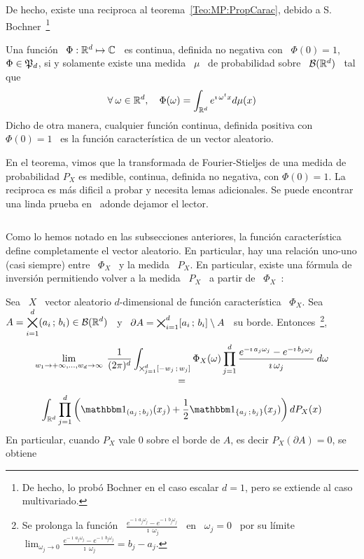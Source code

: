{De  hecho,  existe una  reciproca  al  teorema~\ref{Teo:MP:PropCarac}, debido  a
S. Bochner~\footnote{De  hecho, lo prob\'o Bochner  en el caso escalar  $d = 1$,
  pero  se extiende  al  caso multivariado.}~\cite{Boc32,  Boc59, Gol61,  Pin09,
  Sas13}
%
\begin{teorema}[Bochner]\label{Teo:MP:Bochner}
%
  Una  funci\'on \  $\Phi: \mathbb{R}^d  \mapsto \mathbb{C}$  \ es  continua,  definida no
  negativa con \ $\Phi(0) = 1$, \ie  $\Phi \in \mathfrak{P}_d$, si y solamente existe una
  medida \ $\mu$ \ de probabilidad sobre \ $\mathcal{B}(\mathbb{R}^d)$ \ tal que
  \[
  \forall \:  \omega \in \mathbb{R}^d, \quad \Phi(\omega)  = \int_{\mathbb{R}^d} e^{\imath
    \, \omega^t x} d\mu(x)
  \]
  Dicho de  otra manera, cualquier  funci\'on continua, definida positiva  con \
  $\Phi(0) = 1$ \ es la funci\'on caracter\'istica de un vector aleatorio.
\end{teorema}
%
En el  teorema, vimos que la  transformada de Fourier-Stieljes de  una medida de
probabilidad $P_X$  es medible, continua,  definida no negativa, con  $\Phi(0) =
1$. La  reciproca es  m\'as dificil  a probar y  necesita lemas  adicionales. Se
puede  encontrar una  linda prueba  en~\cite[Sec.~1.7]{Sas13} adonde  dejamor el
lector.

%
\[
\]

Como   lo  hemos   notado   en  las   subsecciones   anteriores,  la   funci\'on
caracter\'istica define  completamente el  vector aleatorio. En  particular, hay
una relaci\'on uno-uno (casi siempre) entre \ $\Phi_X$ \ y la medida \ $P_X$. En
particular, existe una f\'ormula de inversi\'on permitiendo volver a la medida \
$P_X$ \ a partir de \ $\Phi_X$~\cite{AshDol99, Sas13}:
%
\begin{teorema}\label{Teo:MP:InversionFourierStieljes}
%
  Sea \ $X$  \ vector aleatorio $d$-dimensional de  funci\'on caracter\'istica \
  $\Phi_X$.   Sea  \  $\displaystyle  A  = \operatorname*{\bigtimes}_{i=1}^d  (a_i  \, ; \,  b_i)  \in
  \mathcal{B}(\mathbb{R}^d)$ \ y \ $\partial A  = \operatorname*{\bigtimes}_{i=1}^d [a_i \, ; \, b_i] \setminus A$ \
  su borde. Entonces~\footnote{Se prolonga  la funci\'on \ $\frac{e^{- \imath \,
        a_j \omega_j} - e^{- \imath  \, b_j \omega_j}}{\imath \, \omega_j}$ \ en
    \ $\omega_j  = 0$ \ por  su l\'imite \ $\displaystyle  \lim_{\omega_j \to 0}
    \frac{e^{- \imath \, a_j \omega_j} - e^{- \imath \, b_j \omega_j}}{\imath \,
      \omega_j} = b_j - a_j$.},
  \[
  \begin{array}{c}
  \displaystyle \lim_{w_1 \to +\infty,\ldots, w_d \to \infty} \: \frac{1}{(2
  \pi)^d} \int_{\optimes_{j=1}^d [-w_j \; w_j]} \Phi_X(\omega) \prod_{j = 1}^d
  \frac{e^{- \imath \, a_j \omega_j} - e^{- \imath \, b_j \omega_j}}{\imath \,
  \omega_j} \: d\omega\\[2.5mm]
  =\\[2.5mm]
   \displaystyle \int_{\Rset^d} \prod_{j=1}^d \left(
     \un_{\left(  a_j \;  b_j \right)}(x_j)  +  \frac12 \un_{\left\{  a_j \;  b_j
       \right\}}(x_j) \right) dP_X(x)
  \end{array}
  \]
  En particular, cuando $P_X$ vale 0  sobre el borde de $A$, es decir $P_X\left(
  \partial A \right) = 0$, se obtiene


\end{teorema}}
